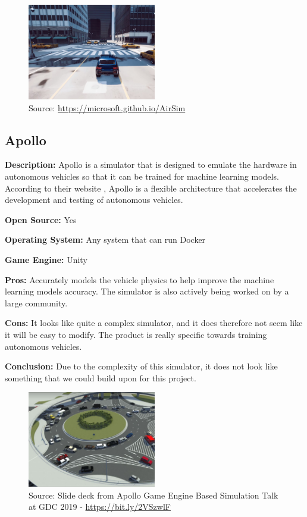 \begin{figure}[H]
    \centering
    \includegraphics[width=0.5\textwidth]{Simulators/AirSim.JPG}
    \caption{Source: \url{https://microsoft.github.io/AirSim}}
\end{figure}

\subsection{Apollo} \label{Apollo}
\textbf{Description:} Apollo is a simulator that is designed to emulate the hardware in autonomous vehicles so that it can be trained for machine learning models. According to their website \cite{Apollo_Website}, Apollo is a flexible architecture that accelerates the development and testing of autonomous vehicles.

\textbf{Open Source:} Yes

\textbf{Operating System:} Any system that can run Docker

\textbf{Game Engine:} Unity

\textbf{Pros:} Accurately models the vehicle physics to help improve the machine learning models accuracy. The simulator is also actively being worked on by a large community.  

\textbf{Cons:} It looks like quite a complex simulator, and it does therefore not seem like it will be easy to modify. The product is really specific towards training autonomous vehicles. 

\textbf{Conclusion:} Due to the complexity of this simulator, it does not look like something that we could build upon for this project. 

\begin{figure}[H]
    \centering
    \includegraphics[width=0.5\textwidth]{Simulators/Apollo.JPG}
    \caption{Source: Slide deck from Apollo Game Engine Based Simulation Talk at GDC 2019 - \url{https://bit.ly/2VSzwlF}}
\end{figure}

